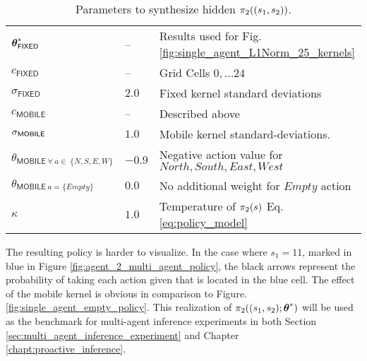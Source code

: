 \begin{table}[H]
    \centering
    \begin{tabular}{l|l l}
        $\boldsymbol{\mathbb{\theta}}^*_{\mathsf{FIXED}}$ & -- & Results used for Fig. \ref{fig:single_agent_L1Norm_25_kernels} \\
        $c_{\mathsf{FIXED}}$ & -- & Grid Cells $0,\ldots 24$ \\
        $\sigma_{\mathsf{FIXED}}$ & $2.0$ & Fixed kernel standard deviations\\
        $c_{\mathsf{MOBILE}}$ & -- & Described above \\
        $\sigma_{\mathsf{MOBILE}}$ & $\mathbf{1.0}$ & Mobile kernel standard-deviations.\\
        $\theta_{\mathsf{MOBILE}\ \forall\ a \in\ \{N,S,E,W\}}$ & $-0.9$  & Negative action value for ${North, South,
                                                                                                        East, West}$\\
        $\theta_{\mathsf{MOBILE}\ a = \{Empty\}}$ & $0.0$  & No additional weight for $Empty$ action \\
        $\kappa$ & $1.0$ & Temperature of $\pi_{2}(s)$ Eq.\ref{eq:policy_model} \\
    \end{tabular}
    \caption{Parameters to synthesize hidden $\pi_{2}((s_1,s_2))$.}
    \label{table:true_multi_agent_2_policy}
\end{table}

    The resulting policy is harder to visualize. In the case where $s_1=11$, marked in blue in Figure
    \ref{fig:agent_2_multi_agent_policy}, the black arrows represent the probability of taking each action given that
     is located in the blue cell. The effect of the mobile kernel is obvious in comparison to Figure.
    \ref{fig:single_agent_empty_policy}. This realization of $\pi_{2}((s_1,s_2);\boldsymbol{\mathbb{\theta}}^*)$ will be used as the
    benchmark for multi-agent inference experiments in both Section \ref{sec:multi_agent_inference_experiment} and Chapter
    \ref{chapt:proactive_inference}.

    \begin{figure}[htb]
        \begin{center}
        \end{center}
\end{figure}



